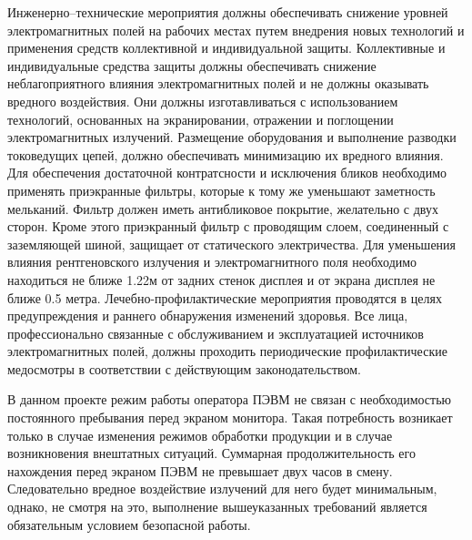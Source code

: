 Инженерно--технические мероприятия должны обеспечивать снижение уровней 
электромагнитных полей на рабочих местах путем внедрения новых технологий
и применения средств коллективной и индивидуальной защиты. Коллективные
и индивидуальные средства защиты должны обеспечивать снижение 
неблагоприятного влияния электромагнитных полей и не должны оказывать 
вредного воздействия. Они должны изготавливаться с использованием технологий,
основанных на экранировании, отражении и поглощении электромагнитных излучений.
Размещение оборудования и выполнение разводки токоведущих цепей, должно обеспечивать
минимизацию их  вредного влияния. Для обеспечения достаточной контратсности и исключения
бликов необходимо применять приэкранные фильтры, которые к тому же уменьшают
заметность мельканий. Фильтр должен иметь антибликовое покрытие, желательно с двух сторон.
Кроме этого приэкранный фильтр с проводящим слоем, соединенный с заземляющей шиной,
защищает от статического электричества. Для уменьшения влияния рентгеновского излучения и
электромагнитного  поля необходимо находиться не ближе 1.22м от задних стенок дисплея и от
экрана дисплея не ближе 0.5 метра. Лечебно-профилактические мероприятия проводятся в целях
предупреждения и  раннего обнаружения изменений здоровья. Все лица, профессионально связанные с
обслуживанием и эксплуатацией источников электромагнитных полей, должны проходить периодические
профилактические медосмотры в соответствии с действующим законодательством.

В данном проекте режим работы оператора ПЭВМ не связан с необходимостью 
постоянного пребывания  перед экраном монитора. Такая потребность возникает только в случае
изменения режимов обработки продукции и в случае возникновения внештатных ситуаций.
Суммарная продолжительность его нахождения перед экраном ПЭВМ  не превышает двух часов в смену.
Следовательно вредное воздействие излучений для него будет минимальным, однако, не смотря
на это, выполнение вышеуказанных требований является обязательным условием безопасной работы.


